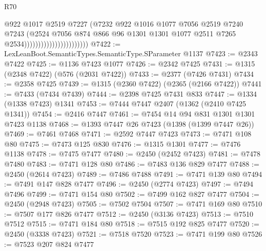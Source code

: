 \begin{lexlean}{R70}
\begin{coremodule}
                                              @922
                                              @1017
                                              @2519
                                              @7227
                                              (@7232
                                                @922
                                                @1016
                                                @1077
                                                @7056
                                                @2519
                                                @7240
                                                @7243
                                                (@2524
                                                  @7056
                                                  @874
                                                  @866
                                                  @96
                                                  @1301
                                                  @1301
                                                  @1077
                                                  @2511
                                                  @7265
                                                  @2534)))))))))))))))))))))))
@7422 := LexLeanBoot.SemanticTypes.SemanticType.SParameter @1137
@7423 := @2343 @7422
@7425 := @1136 @7423 @1077
@7426 := @2342 @7425
@7431 := @1315 (@2348 @7422) (@576 (@2031 @7422))
@7433 := @2377 (@7426 @7431)
@7434 := @2358 @7425
@7439 := @1315 (@2360 @7422) (@2365 (@2166 @7422))
@7441 := @7433 (@7434 @7439)
@7444 := @2398 @7425 @7431 @833
@7447 := @1334 (@1338 @7423) @1341
@7453 := @7444 @7447 @2407 (@1362 (@2410 @7425 @1341))
@7454 := @2416 @7447
@7461 := @7454 @14 @94 @831 @1301 @1301 @7423 @1138
@7468 := @1393 @7447 @26 @7423 (@1398 (@1399 @7447 @26))
@7469 := @7461 @7468
@7471 := @2592 @7447 @7423
@7473 := @7471 @108 @80
@7475 := @7473 @125 @830
@7476 := @1315 @1301
@7477 := @7476 @1138
@7478 := @7475 @7477
@7480 := @2450 (@2452 @7423)
@7481 := @7478 @7480
@7483 := @7471 @128 @80
@7486 := @7483 @136 @829 @7477
@7488 := @2450 (@2614 @7423)
@7489 := @7486 @7488
@7491 := @7471 @139 @80
@7494 := @7491 @147 @828 @7477
@7496 := @2450 (@2774 @7423)
@7497 := @7494 @7496
@7499 := @7471 @154 @80
@7502 := @7499 @162 @827 @7477
@7504 := @2450 (@2948 @7423)
@7505 := @7502 @7504
@7507 := @7471 @169 @80
@7510 := @7507 @177 @826 @7477
@7512 := @2450 (@3136 @7423)
@7513 := @7510 @7512
@7515 := @7471 @184 @80
@7518 := @7515 @192 @825 @7477
@7520 := @2450 (@3338 @7423)
@7521 := @7518 @7520
@7523 := @7471 @199 @80
@7526 := @7523 @207 @824 @7477

\end{coremodule}
\end{lexlean}
